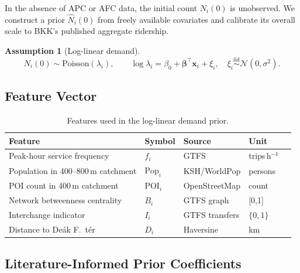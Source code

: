 \documentclass[11pt,a4paper]{article}
\theoremstyle{plain}
\theoremstyle{definition}
\newtheorem{assumption}[theorem]{Assumption}
\theoremstyle{remark}
\begin{document}
In the absence of APC or AFC data, the initial count $N_i(0)$ is unobserved.
We construct a prior $\hat{N}_i(0)$ from freely available covariates and
calibrate its overall scale to BKK's published aggregate ridership.

\begin{assumption}[Log-linear demand]
\begin{equation}
  N_i(0)\sim\mathrm{Poisson}(\lambda_i),\qquad
  \log\lambda_i = \beta_0+\boldsymbol{\beta}^\top\mathbf{x}_i+\xi_i,\quad
  \xi_i\overset{\mathrm{iid}}{\sim}\mathcal{N}(0,\sigma^2).
  \label{eq:loglinear}
\end{equation}
\end{assumption}

\subsection{Feature Vector}

\begin{table}[h]
\centering
\caption{Features used in the log-linear demand prior.}
\label{tab:features}
\begin{tabular}{lllll}
\toprule
Feature & Symbol & Source & Unit \\
\midrule
Peak-hour service frequency     & $f_i$       & GTFS             & trips\,h$^{-1}$ \\
Population in 400--800\,m catchment & $\mathrm{Pop}_i$ & KSH/WorldPop & persons \\
POI count in 400\,m catchment   & $\mathrm{POI}_i$ & OpenStreetMap  & count \\
Network betweenness centrality  & $B_i$       & GTFS graph       & [0,1] \\
Interchange indicator           & $I_i$       & GTFS transfers   & $\{0,1\}$ \\
Distance to De\'ak F.\ t\'er   & $D_i$       & Haversine        & km \\
\bottomrule
\end{tabular}
\end{table}

\subsection{Literature-Informed Prior Coefficients}
\end{document}
